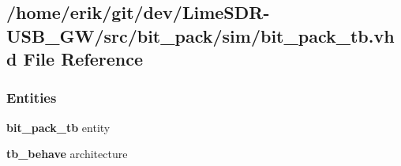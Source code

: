 \subsection{/home/erik/git/dev/\+Lime\+S\+D\+R-\/\+U\+S\+B\+\_\+\+G\+W/src/bit\+\_\+pack/sim/bit\+\_\+pack\+\_\+tb.vhd File Reference}
\label{bit__pack_2sim_2bit__pack__tb_8vhd}
\subsubsection*{Entities}
\begin{DoxyCompactItemize}
\item 
{\bf bit\+\_\+pack\+\_\+tb} entity
\item 
{\bf tb\+\_\+behave} architecture
\end{DoxyCompactItemize}
